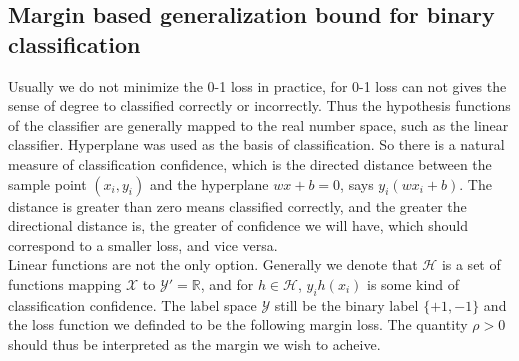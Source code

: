 \subsection{Margin based generalization bound for binary classification}
Usually we do not minimize the 0-1 loss in practice, for 0-1 loss can not gives the sense of degree to classified correctly or incorrectly. Thus the hypothesis functions of the classifier are generally mapped to the real number space, such as the linear classifier. Hyperplane was used as the basis of classification. So there is a natural measure of classification confidence, which is the directed distance between the sample point $(x_i, y_i)$ and the hyperplane $wx+b=0$, says $y_i(wx_i+b)$. The distance is greater than zero means classified correctly, and the greater the directional distance is, the greater of confidence we will have, which should correspond to a smaller loss, and vice versa. \\

Linear functions are not the only option. Generally we denote that $\mathcal{H}$ is a set of functions mapping $\mathcal{X}$ to $\mathcal{Y}' = \mathbb{R}$, and for $h \in \mathcal{H}$, $y_ih(x_i)$ is some kind of classification confidence. The label space $\mathcal{Y}$ still be the binary label $\{+1,-1\}$ and the loss function we definded to be the following margin loss. 
The quantity $\rho > 0$ should thus be interpreted as the margin we wish to acheive.

